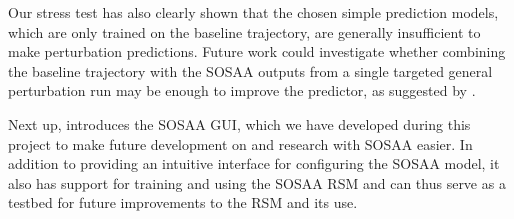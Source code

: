 Our stress test has also clearly shown that the chosen simple prediction models, which are only trained on the baseline trajectory, are generally insufficient to make perturbation predictions. Future work could investigate whether combining the baseline trajectory with the SOSAA outputs from a single targeted general perturbation run may be enough to improve the predictor, as suggested by \textcite{deep-rsm-2020}.

\newpar Next up,  introduces the SOSAA GUI, which we have developed during this project to make future development on and research with SOSAA easier. In addition to providing an intuitive interface for configuring the SOSAA model, it also has support for training and using the SOSAA RSM and can thus serve as a testbed for future improvements to the RSM and its use.
